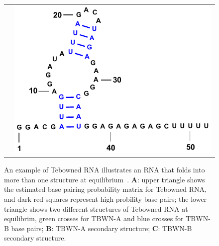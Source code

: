 \begin{figure}[t]
\begin{tabular}{cc}
&\hspace{0.1cm}\includegraphics[scale=0.35]{figs/TBWN-B-3}\\
\end{tabular}
\caption{
An example of Tebowned RNA illustrates 
an RNA that
folds into more than one structure at equilibrium~\cite{Cordero+Das:2015}.
	{\bf A}: upper triangle shows the estimated base pairing probability matrix for Tebowned RNA, and dark red squares represent high probility base pairs; the lower triangle shows two different structures of Tebowned RNA at equilibrim, green crosses for TBWN-A and blue crosses for TBWN-B base pairs;
    {\bf B}: TBWN-A secondary structure;
    {\bf C}: TBWN-B secondary structure.
\label{Tebowned-RNA}}
\vspace{-0.3cm}
\end{figure}

